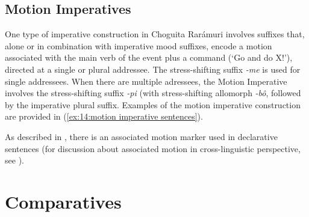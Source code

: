 \subsection{Motion Imperatives}
\label{subsec: motion imperatives}

One type of imperative construction in Choguita Rarámuri involves suffixes that, alone or in combination with imperative mood suffixes, encode a motion associated with the main verb of the event plus a command (`Go and do X!'), directed at a single or plural addressee. The stress-shifting suffix \textit{-me} is used for single addressees. When there are multiple adressees, the Motion Imperative involves the stress-shifting suffix \textit{-pi} (with stress-shifting allomorph \textit{-bô}, followed by the imperative plural suffix. Examples of the motion imperative construction are provided in (\ref{ex:14:motion imperative sentences}).

\newpage
\ea\label{ex:14:motion imperative sentences}

    \z
\z

As described in , there is an associated motion marker used in declarative sentences (for discussion about associated motion in cross-linguistic perspective, see \citealt{guillaume2016associated}).


\section{Comparatives}
\label{sec:14:comparative constructions}

